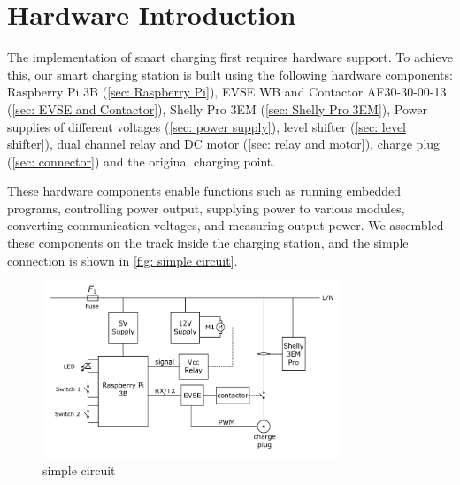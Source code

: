 \documentclass[
	english,
	ruledheaders=section,%
	class=report,%
	thesis={type=Report},%
	accentcolor=9c,%
	custommargins=true,%
	marginpar=false,%
	parskip=half-,%
	fontsize=11pt,%
	logofile={img/tuda_logo.pdf}, %
]{tudapub}
\begin{document}
\chapter{Hardware Introduction}
The implementation of smart charging first requires hardware support. To achieve this, our smart charging station is built using the following hardware components:
Raspberry Pi 3B (\autoref{sec: Raspberry Pi}), EVSE WB and Contactor AF30-30-00-13 (\autoref{sec: EVSE and Contactor}), Shelly Pro 3EM (\autoref{sec: Shelly Pro 3EM}), Power supplies of different voltages (\autoref{sec: power supply}), level shifter (\autoref{sec: level shifter}), dual channel relay and DC motor (\autoref{sec: relay and motor}), charge plug (\autoref{sec: connector}) and the original charging point.

These hardware components enable functions such as running embedded programs, controlling power output, supplying power to various modules, converting communication voltages, and measuring output power.
We assembled these components on the track inside the charging station, and the simple connection is shown in \autoref{fig: simple circuit}.

\begin{figure}[H]
    \centering
    \includegraphics[width=0.8\textwidth]{img/circuit_simple.png} 
    \caption{simple circuit}
    \label{fig: simple circuit}
\end{figure}
\end{document}
